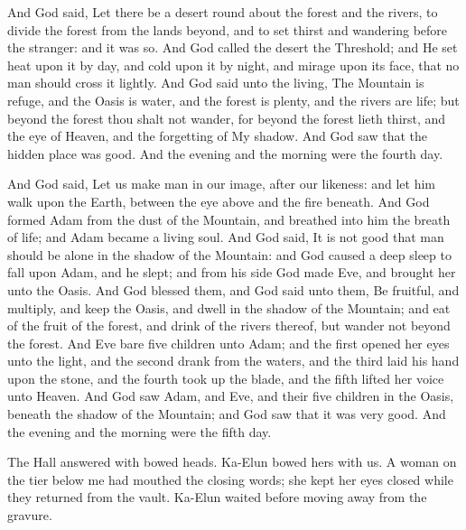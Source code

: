 \begin{scripture}
And God said, Let there be a desert round about the forest and the rivers, to divide the forest from the lands beyond, and to set thirst and wandering before the stranger: and it was so. 
And God called the desert the Threshold; and He set heat upon it by day, and cold upon it by night, and mirage upon its face, that no man should cross it lightly.
And God said unto the living, The Mountain is refuge, and the Oasis is water, and the forest is plenty, and the rivers are life; but beyond the forest thou shalt not wander, for beyond the forest lieth thirst, and the eye of Heaven, and the forgetting of My shadow. 
And God saw that the hidden place was good. And the evening and the morning were the fourth day.
\end{scripture}

\begin{scripture}
And God said, Let us make man in our image, after our likeness: and let him walk upon the Earth, between the eye above and the fire beneath. 
And God formed Adam from the dust of the Mountain, and breathed into him the breath of life; and Adam became a living soul. And God said, It is not good that man should be alone in the shadow of the Mountain: and God caused a deep sleep to fall upon Adam, and he slept; and from his side God made Eve, and brought her unto the Oasis. 
And God blessed them, and God said unto them, Be fruitful, and multiply, and keep the Oasis, and dwell in the shadow of the Mountain; and eat of the fruit of the forest, and drink of the rivers thereof, but wander not beyond the forest. 
And Eve bare five children unto Adam; and the first opened her eyes unto the light, and the second drank from the waters, and the third laid his hand upon the stone, and the fourth took up the blade, and the fifth lifted her voice unto Heaven. 
And God saw Adam, and Eve, and their five children in the Oasis, beneath the shadow of the Mountain; and God saw that it was very good. And the evening and the morning were the fifth day.
\end{scripture}

The Hall answered with bowed heads. Ka-Elun bowed hers with us. A woman on the tier below me had mouthed the closing words; she kept her eyes closed while they returned from the vault. Ka-Elun waited before moving away from the gravure.\par

